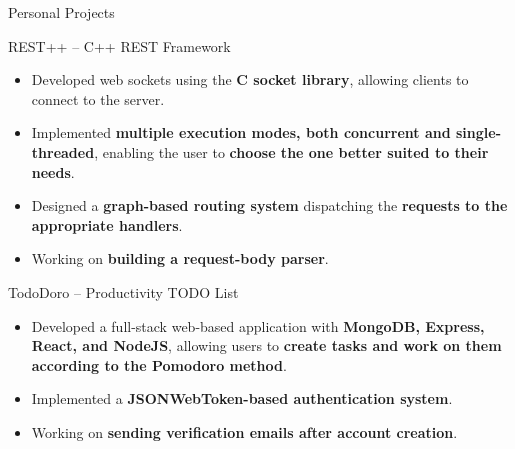 \documentclass{article}
\newlength{\tabin}
\newlength{\secsep}
\newcommand{\lineunder}{\vspace*{-8pt} \\ \hspace*{-6pt} \hrulefill \\ \vspace*{-15pt}}
\newenvironment{tabbedsection}[1]{
  \begin{list}{}{
      \setlength{\itemsep}{0pt}
      \setlength{\labelsep}{0pt}
      \setlength{\labelwidth}{0pt}
      \setlength{\leftmargin}{\tabin}
      \setlength{\rightmargin}{\tabin}
      \setlength{\listparindent}{0pt}
      \setlength{\parsep}{0pt}
      \setlength{\parskip}{0pt}
      \setlength{\partopsep}{0pt}
      \setlength{\topsep}{#1}
    }
  \item[]
}{\end{list}}
\newenvironment{resume_section}[1]{
  \filbreak
  \vspace{2\secsep}
  \textsc{\large#1}
  \lineunder
  \begin{tabbedsection}{\secsep}
}{\end{tabbedsection}}
\newenvironment{resume_subsection}[2][]{
  \textbf{#2} \hfill {\footnotesize #1} \hspace{2em}
  \begin{tabbedsection}{0.5\secsep}
}{\end{tabbedsection}}
\newenvironment{subitems}{
  \renewcommand{\labelitemi}{-}
  \begin{itemize}
      \setlength{\labelsep}{1em}
}{\end{itemize}}
\begin{document}
\begin{resume_section}{Personal Projects}

	\begin{resume_subsection}{REST++ -- C++ REST Framework}
		\begin{subitems}
			\item Developed web sockets using the \textbf{C socket library}, allowing clients to connect to the server.
			\item Implemented \textbf{multiple execution modes, both concurrent and single-threaded}, enabling the user to \textbf{choose the one better suited to their needs}.
			\item Designed a \textbf{graph-based routing system} dispatching the \textbf{requests to the appropriate handlers}.
			\item Working on \textbf{building a request-body parser}.
		\end{subitems}
	\end{resume_subsection}
	
	\begin{resume_subsection}{TodoDoro -- Productivity TODO List}
 		\begin{subitems}
 			\item Developed a full-stack web-based application with \textbf{MongoDB, Express, React, and NodeJS}, allowing users to \textbf{create tasks and work on them according to the Pomodoro method}.
 			\item Implemented a \textbf{JSONWebToken-based authentication system}.
 			\item Working on \textbf{sending verification emails after account creation}.
 		\end{subitems}
	\end{resume_subsection}

\end{resume_section}
\end{document}
